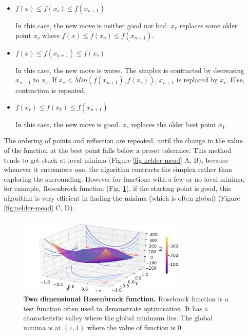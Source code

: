 \begin{itemize}
  \item $f(x) \leq f(x_r) \leq f(x_{n+1})$
  
  In this case, the new move is neither good nor bad. $x_r$ replaces some older point $x_o$ where $f(x) \leq f(x_o) \leq f(x_{n+1})$.
  
  \item $f(x) \leq f(x_{n+1}) \leq f(x_r) $
  
  In this case, the new move is worse. The simplex is contracted by decreasing $x_{n+1}$ to $x_c$. If $x_c < Min(f(x_{n+1}), f(x_r))$, $x_{n+1}$ is replaced by $x_c$. Else, contraction is repeated.
  
  \item $f(x_r) \leq f(x_1) \leq f(x_{n+1}) $
  
  In this case, the new move is good. $x_r$ replaces the older best point $x_1$. 
\end{itemize}

The ordering of points and reflection are repeated, until the change in the value of the function at the best point falls below a preset tolerance. This method tends to get stuck at local minima (Figure \ref{fig:nelder-mead} A, B), because whenever it encounters one, the algorithm contracts the simplex rather than exploring the surrounding. However for functions with a few or no local minima, for example, Rosenbrock function (Fig. \ref{fig:rosen}), if the starting point is good, this algorithm is very efficient in finding the minima (which is often global) (Figure \ref{fig:nelder-mead} C, D).


\begin{figure}[H]
\center
\includegraphics[width=0.75\textwidth]{chapters/Introduction/Figures/rosen.pdf}
\caption[Two dimensional Rosenbrock function.]{\textbf{Two dimensional Rosenbrock function.} Rosebrock function is a test function often used to demonstrate optimisation. It has a characteristic valley where the global minimum lies. The global minima is at $(1, 1)$ where the value of function is $0$.}%
\label{fig:rosen}
\end{figure}

